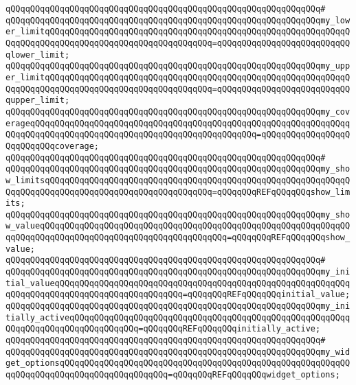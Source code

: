 \verb|qQQqqQQqqQQqqQQqqQQqqQQqqQQqqQQqqQQqqQQqqQQqqQQqqQQqqQQqqQQqqQQq#|\newline
\verb|qQQqqQQqqQQqqQQqqQQqqQQqqQQqqQQqqQQqqQQqqQQqqQQqqQQqqQQqqQQqqQQqmy_lower_limitqQQqqQQqqQQqqQQqqQQqqQQqqQQqqQQqqQQqqQQqqQQqqQQqqQQqqQQqqQQqqQQqqQQqqQQqqQQqqQQqqQQqqQQqqQQqqQQqqQQqqQQq=qQQqqQQqqQQqqQQqqQQqqQQqqQQqlower_limit;|\newline
\verb|qQQqqQQqqQQqqQQqqQQqqQQqqQQqqQQqqQQqqQQqqQQqqQQqqQQqqQQqqQQqqQQqmy_upper_limitqQQqqQQqqQQqqQQqqQQqqQQqqQQqqQQqqQQqqQQqqQQqqQQqqQQqqQQqqQQqqQQqqQQqqQQqqQQqqQQqqQQqqQQqqQQqqQQqqQQqqQQq=qQQqqQQqqQQqqQQqqQQqqQQqqQQqupper_limit;|\newline
\verb|qQQqqQQqqQQqqQQqqQQqqQQqqQQqqQQqqQQqqQQqqQQqqQQqqQQqqQQqqQQqqQQqmy_coverageqQQqqQQqqQQqqQQqqQQqqQQqqQQqqQQqqQQqqQQqqQQqqQQqqQQqqQQqqQQqqQQqqQQqqQQqqQQqqQQqqQQqqQQqqQQqqQQqqQQqqQQqqQQqqQQqqQQq=qQQqqQQqqQQqqQQqqQQqqQQqqQQqcoverage;|\newline
\verb|qQQqqQQqqQQqqQQqqQQqqQQqqQQqqQQqqQQqqQQqqQQqqQQqqQQqqQQqqQQqqQQq#|\newline
\verb|qQQqqQQqqQQqqQQqqQQqqQQqqQQqqQQqqQQqqQQqqQQqqQQqqQQqqQQqqQQqqQQqmy_show_limitsqQQqqQQqqQQqqQQqqQQqqQQqqQQqqQQqqQQqqQQqqQQqqQQqqQQqqQQqqQQqqQQqqQQqqQQqqQQqqQQqqQQqqQQqqQQqqQQqqQQqqQQq=qQQqqQQqREFqQQqqQQqshow_limits;|\newline
\verb|qQQqqQQqqQQqqQQqqQQqqQQqqQQqqQQqqQQqqQQqqQQqqQQqqQQqqQQqqQQqqQQqmy_show_valueqQQqqQQqqQQqqQQqqQQqqQQqqQQqqQQqqQQqqQQqqQQqqQQqqQQqqQQqqQQqqQQqqQQqqQQqqQQqqQQqqQQqqQQqqQQqqQQqqQQqqQQqqQQq=qQQqqQQqREFqQQqqQQqshow_value;|\newline
\verb|qQQqqQQqqQQqqQQqqQQqqQQqqQQqqQQqqQQqqQQqqQQqqQQqqQQqqQQqqQQqqQQq#|\newline
\verb|qQQqqQQqqQQqqQQqqQQqqQQqqQQqqQQqqQQqqQQqqQQqqQQqqQQqqQQqqQQqqQQqmy_initial_valueqQQqqQQqqQQqqQQqqQQqqQQqqQQqqQQqqQQqqQQqqQQqqQQqqQQqqQQqqQQqqQQqqQQqqQQqqQQqqQQqqQQqqQQqqQQqqQQq=qQQqqQQqREFqQQqqQQqinitial_value;|\newline
\verb|qQQqqQQqqQQqqQQqqQQqqQQqqQQqqQQqqQQqqQQqqQQqqQQqqQQqqQQqqQQqqQQqmy_initially_activeqQQqqQQqqQQqqQQqqQQqqQQqqQQqqQQqqQQqqQQqqQQqqQQqqQQqqQQqqQQqqQQqqQQqqQQqqQQqqQQqqQQq=qQQqqQQqREFqQQqqQQqinitially_active;|\newline
\verb|qQQqqQQqqQQqqQQqqQQqqQQqqQQqqQQqqQQqqQQqqQQqqQQqqQQqqQQqqQQqqQQq#|\newline
\verb|qQQqqQQqqQQqqQQqqQQqqQQqqQQqqQQqqQQqqQQqqQQqqQQqqQQqqQQqqQQqqQQqmy_widget_optionsqQQqqQQqqQQqqQQqqQQqqQQqqQQqqQQqqQQqqQQqqQQqqQQqqQQqqQQqqQQqqQQqqQQqqQQqqQQqqQQqqQQqqQQqqQQq=qQQqqQQqREFqQQqqQQqwidget_options;|\newline
